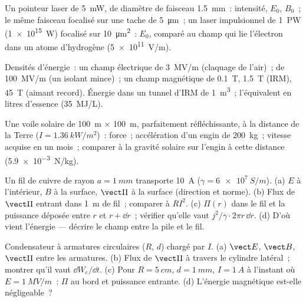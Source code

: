 \begin{exercise}[$\star$]\label{exo:b2:poynting-vector:2}
Un pointeur laser de \qty{5}{mW}, de diamètre de faisceau \qty{1.5}{mm}~: intensité, $E_0$,
$B_0$~; le même faisceau focalisé sur une tache de \qty{5}{\micro m}~; un laser impulsionnel de \qty{1}{PW}
(\qty{1e15}{W}) focalisé sur \qty{10}{\micro m^2}~: $E_0$, comparé
au champ qui lie l'électron dans un atome d'hydrogène (\qty{5e11}{V/m}).
\end{exercise}

\begin{exercise}[$\star$]\label{exo:b2:poynting-vector:3}
Densités d'énergie~: un champ électrique de \qty{3}{MV/m} (claquage de l'air)~;
de \qty{100}{MV/m} (un isolant mince)~; un champ magnétique de \qty{0.1}{T},
\qty{1.5}{T} (IRM), \qty{45}{T} (aimant record). Énergie dans un tunnel d'IRM de \qty{1}{m^3}~;
l'équivalent en litres d'essence (\qty{35}{MJ/L}).
\end{exercise}

\begin{exercise}[$\star$]\label{exo:b2:poynting-vector:4}
Une voile solaire de \qty{100}{m} $\times$ \qty{100}{m}, parfaitement réfléchissante, à
la distance de la Terre ($I = \qty{1.36}{kW/m^2}$)~: force~; accélération d'un
engin de \qty{200}{kg}~; vitesse acquise en un mois~; comparer à la
gravité solaire sur l'engin à cette distance (\qty{5.9e-3}{N/kg}).
\end{exercise}

\begin{exercise}[$\star\star$]\label{exo:b2:poynting-vector:5}
Un fil de cuivre de rayon $a = \qty{1}{mm}$ transporte \qty{10}{A} ($\gamma =
\qty{6e7}{S/m}$). (a) $E$ à l'intérieur, $B$ à la surface, $\vect\Pi$ à la
surface (direction et norme). (b) Flux de $\vect\Pi$ entrant dans \qty{1}{m}
de fil~; comparer à $RI^2$. (c) $\Pi(r)$ dans le fil et la puissance
déposée entre $r$ et $r + \dd r$~; vérifier qu'elle vaut $j^2/\gamma\cdot2\pi r\,\dd r$.
(d) D'où vient l'énergie --- décrire le champ entre
la pile et le fil.
\end{exercise}

\begin{exercise}[$\star\star$]\label{exo:b2:poynting-vector:6}
Condensateur à armatures circulaires ($R$, $d$) chargé par $I$. (a) $\vect E$, $\vect B$,
$\vect\Pi$ entre les armatures. (b) Flux de $\vect\Pi$ à travers le cylindre
latéral~; montrer qu'il vaut $\dd W_e/\dd t$. (c) Pour $R = \qty{5}{cm}$, $d =
\qty{1}{mm}$, $I = \qty{1}{A}$ à l'instant où $E = \qty{1}{MV/m}$~: $\Pi$ au
bord et puissance entrante. (d) L'énergie magnétique est-elle négligeable~?
\end{exercise}

